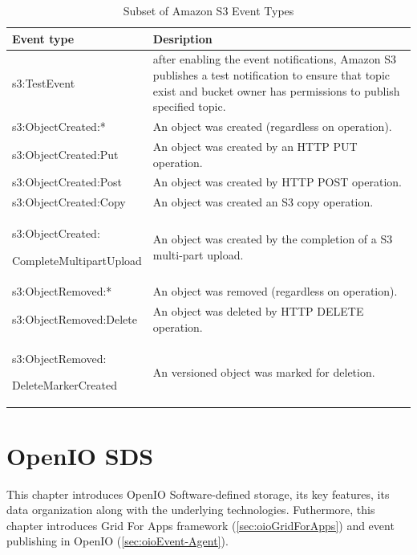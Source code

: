      \renewcommand*{\arraystretch}{1.4}
     \begin{table}
     \begin{tabularx}{\textwidth}{|p{}|X|}
         \hline
         \textbf{Event type} & \textbf{Desription} \\
         \hline
         s3:TestEvent & after enabling the event notifications, Amazon S3 publishes a test notification to ensure that topic exist and bucket owner has permissions to publish specified topic. \\
         \hline
         s3:ObjectCreated:* & An object was created (regardless on operation). \\
         \hline
         s3:ObjectCreated:Put & An object was created by an HTTP PUT operation. \\
         \hline
         s3:ObjectCreated:Post & An object was created by HTTP POST operation. \\
         \hline
         s3:ObjectCreated:Copy & An object was created an S3 copy operation. \\
         \hline
         s3:ObjectCreated:

         CompleteMultipartUpload & An object was created by the completion of a S3 multi-part upload. \\
         \hline
         s3:ObjectRemoved:* & An object was removed (regardless on operation). \\
         \hline
         s3:ObjectRemoved:Delete & An object was deleted by HTTP DELETE operation. \\
         \hline
         s3:ObjectRemoved:

         DeleteMarkerCreated & An versioned object was marked for deletion. \\
         \hline
    \end{tabularx}
    \caption{Subset of Amazon S3 Event Types \cite{eventS3EventNotificationDest}\label{tab:eventTypesS3}}
    \end{table}


\chapter{OpenIO SDS}
    This chapter introduces OpenIO Software-defined storage, its key features, its data organization along with the underlying technologies. Futhermore, this chapter introduces Grid For Apps framework (\ref{sec:oioGridForApps}) and event publishing in OpenIO (\ref{sec:oioEvent-Agent}).

